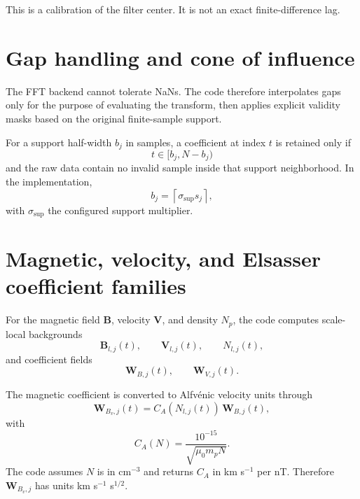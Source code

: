\documentclass[11pt]{article}
\begin{document}
This is a calibration of the filter center. It is not an exact finite-difference
lag.

\section{Gap handling and cone of influence}

The FFT backend cannot tolerate NaNs. The code therefore interpolates gaps only for
the purpose of evaluating the transform, then applies explicit validity masks based
on the original finite-sample support.

For a support half-width $b_j$ in samples, a coefficient at index $t$ is retained
only if
\begin{equation}
 t \in [b_j, N-b_j)
\end{equation}
and the raw data contain no invalid sample inside that support neighborhood. In the
implementation,
\begin{equation}
 b_j = \left\lceil \sigma_{\mathrm{sup}} s_j \right\rceil,
\end{equation}
with $\sigma_{\mathrm{sup}}$ the configured support multiplier.

\section{Magnetic, velocity, and Elsasser coefficient families}

For the magnetic field $\mathbf{B}$, velocity $\mathbf{V}$, and density $N_p$, the
code computes scale-local backgrounds
\begin{equation}
 \mathbf{B}_{l,j}(t), \qquad \mathbf{V}_{l,j}(t), \qquad N_{l,j}(t),
\end{equation}
and coefficient fields
\begin{equation}
 \mathbf{W}_{B,j}(t), \qquad \mathbf{W}_{V,j}(t).
\end{equation}

The magnetic coefficient is converted to Alfv\'enic velocity units through
\begin{equation}
 \mathbf{W}_{B_v,j}(t) = C_A\!\left(N_{l,j}(t)\right) \, \mathbf{W}_{B,j}(t),
\end{equation}
with
\begin{equation}
 C_A(N) = \frac{10^{-15}}{\sqrt{\mu_0 m_p N}}.
\end{equation}
The code assumes $N$ is in cm$^{-3}$ and returns $C_A$ in km s$^{-1}$ per nT.
Therefore $\mathbf{W}_{B_v,j}$ has units km s$^{-1}$ s$^{1/2}$.
\end{document}
